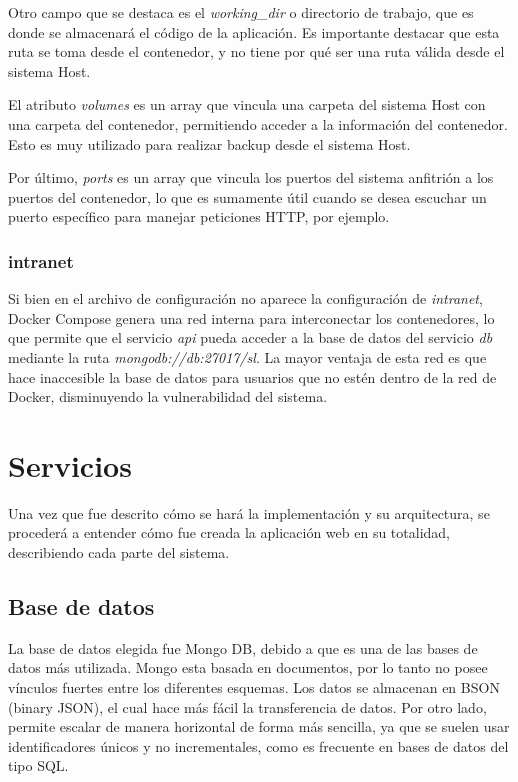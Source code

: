 Otro campo que se destaca es el \textit{working\_dir} o directorio de trabajo, que es donde se almacenará el código de la aplicación. Es importante destacar que esta ruta se toma desde el contenedor, y no tiene por qué ser una ruta válida desde el sistema Host.

El atributo \textit{volumes} es un array que vincula una carpeta del sistema Host con una carpeta del contenedor, permitiendo acceder a la información del contenedor.
Esto es muy utilizado para realizar backup desde el sistema Host.

Por último, \textit{ports} es un array que vincula los puertos del sistema anfitrión a los puertos del contenedor, lo que es sumamente útil cuando se desea escuchar un puerto específico para manejar peticiones HTTP, por ejemplo.

\subsubsection{intranet}

Si bien en el archivo de configuración no aparece la configuración de \textit{intranet}, Docker Compose genera una red interna para interconectar los contenedores, lo que permite que el servicio \textit{api} pueda acceder a la base de datos del servicio \textit{db} mediante la ruta \textit{mongodb://db:27017/sl}. La mayor ventaja de esta red es que hace inaccesible la base de datos para usuarios que no estén dentro de la red de Docker, disminuyendo la vulnerabilidad del sistema.


\section{Servicios}

Una vez que fue descrito cómo se hará la implementación y su arquitectura, se procederá a entender cómo fue creada la aplicación web en su totalidad, describiendo cada parte del sistema.

\subsection{Base de datos}

La base de datos elegida fue Mongo DB, debido a que es una de las bases de datos más utilizada. Mongo esta basada en documentos, por lo tanto no posee vínculos fuertes entre los diferentes esquemas.
Los datos se almacenan en BSON (binary JSON), el cual hace más fácil la transferencia de datos. Por otro lado, permite escalar de manera horizontal de forma más sencilla, ya que se suelen usar identificadores únicos y no incrementales, como es frecuente en bases de datos del tipo SQL.

